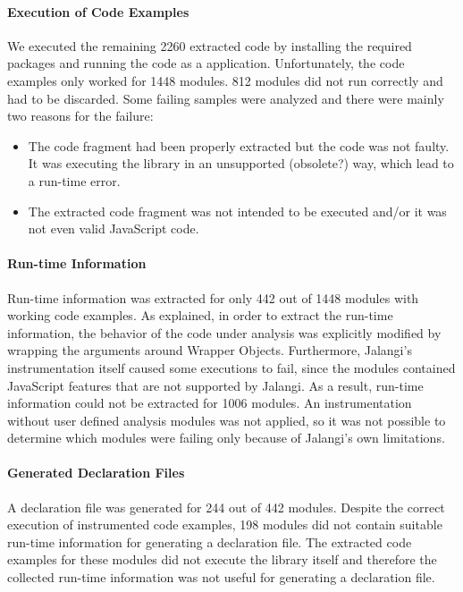 \documentclass[english,cleveref,autoref,submission]{programming}
\begin{document}
\paragraph*{Execution of Code Examples}
We executed the remaining 2260 extracted code by installing the
required packages and running the code as a \NodeJS{}
application. Unfortunately, the code examples only worked for 1448
modules. 812 modules did not run correctly and had to be
discarded. Some failing samples were analyzed and there were mainly
two reasons for the failure: 
\begin{itemize}
\item The code fragment had been properly extracted but the code was
  not faulty. It was executing the library in an unsupported
  (obsolete?) way, which lead to a run-time error.
\item The extracted code fragment was not intended to be executed
  and/or it was not even valid JavaScript code. 
\end{itemize}

\paragraph*{Run-time Information}
Run-time information was extracted for only 442 out of 1448 modules with working code examples. As explained, in order to extract the run-time information, the behavior of the code under analysis was explicitly modified by wrapping the arguments around Wrapper Objects. Furthermore, Jalangi’s instrumentation itself caused some executions to fail, since the modules contained JavaScript features that are not supported by Jalangi. As a result, run-time information could not be extracted for 1006 modules. An instrumentation without user defined analysis modules was not applied, so it was not possible to determine which modules were failing only because of Jalangi’s own limitations.

\paragraph*{Generated Declaration Files}
A declaration file was generated for 244 out of 442 modules. Despite the correct execution of instrumented code examples, 198 modules did not contain suitable run-time information for generating a declaration file. The extracted code examples for these modules did not execute the library itself and therefore the collected run-time information was not useful for generating a declaration file.
\end{document}
